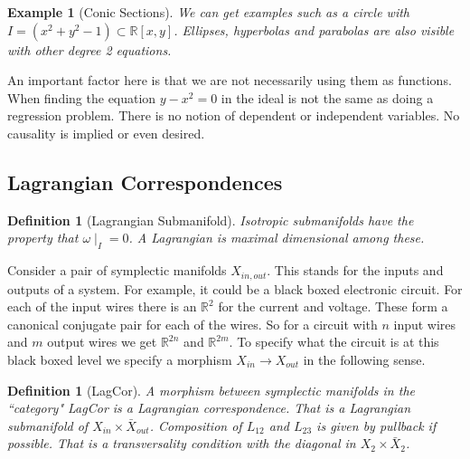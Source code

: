 \documentclass[a4paper,landscape]{article}
\theoremstyle{change}
\newtheorem{definition}[equation]{Definition}
\newtheorem{example}[equation]{Example}
\theoremstyle{nonumberplain}
\numberwithin{equation}{section}
\begin{document}
\begin{example}[Conic Sections]
We can get examples such as a circle with $I = (x^2 + y^2 - 1) \subset \mathbb{R}[x,y]$. Ellipses, hyperbolas and parabolas are also visible with other degree 2 equations.
\end{example}

An important factor here is that we are not necessarily using them as functions. When finding the equation $y-x^2=0$ in the ideal is not the same as doing a regression problem. There is no notion of dependent or independent variables. No causality is implied or even desired.

\subsection{Lagrangian Correspondences}

\begin{definition}[Lagrangian Submanifold]
Isotropic submanifolds have the property that $\omega \mid_I = 0$. A Lagrangian is maximal dimensional among these.
\end{definition}

Consider a pair of symplectic manifolds $X_{in,out}$. This stands for the inputs and outputs of a system. For example, it could be a black boxed electronic circuit. For each of the input wires there is an $\mathbb{R}^2$ for the current and voltage. These form a canonical conjugate pair for each of the wires. So for a circuit with $n$ input wires and $m$ output wires we get $\mathbb{R}^{2n}$ and $\mathbb{R}^{2m}$. To specify what the circuit is at this black boxed level we specify a morphism $X_{in} \to X_{out}$ in the following sense.

\begin{definition}[LagCor]
A morphism between symplectic manifolds in the ``category" LagCor is a Lagrangian correspondence. That is a Lagrangian submanifold of $X_{in} \times \bar{X}_{out}$. Composition of $L_{12}$ and $L_{23}$ is given by pullback if possible. That is a transversality condition with the diagonal in $X_2 \times \bar{X}_2$.


\end{definition}
\end{document}
